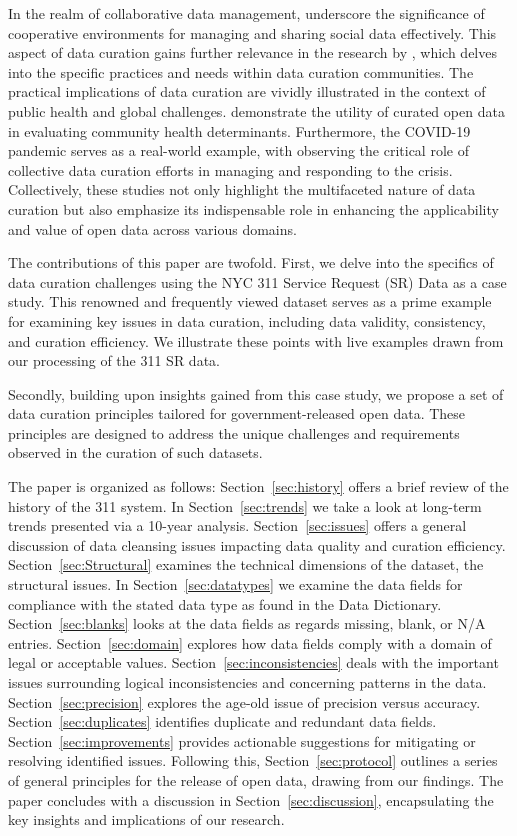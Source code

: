 \documentclass[12pt, titlepage]{article}
\begin{document}
In the realm of collaborative data management,
\citet{beheshti2019datasynapse} underscore the significance of
cooperative environments for managing and sharing social data
effectively. This aspect of data curation gains further relevance in
the research by \citet{mclure2014data}, which delves into the specific
practices and needs within data curation communities. The practical
implications of data curation are vividly illustrated in the context
of public health and global challenges. \citet{cantor2018facets}
demonstrate the utility of curated open data in evaluating community
health determinants. Furthermore, the COVID-19 pandemic serves as a
real-world example, with \citet{shankar2021data} observing the
critical role of collective data curation efforts in managing and
responding to the crisis. Collectively, these studies not only highlight the 
multifaceted nature of data curation but also emphasize
its indispensable role in enhancing the applicability and value of
open data across various domains.

The contributions of this paper are twofold. First, we delve into
the specifics of data curation challenges using the NYC 311 Service
Request (SR) Data as a case study. This renowned and frequently viewed 
dataset serves as a prime example for examining key issues in data curation, 
including data validity, consistency, and curation efficiency. 
We illustrate these points with live examples drawn from our processing of the 311 SR data. 

Secondly, building upon insights gained from this case study, we 
propose a set of data curation principles tailored for government-released open data. 
These principles are designed to address the unique challenges 
and requirements observed in the curation of such datasets.

The paper is organized as follows:
Section~\ref{sec:history} offers a brief review of the history of the 311 system. In 
Section~\ref{sec:trends} we take a look at long-term trends presented via a 10-year analysis.
Section~\ref{sec:issues} offers a general discussion of data cleansing issues
impacting data quality and curation efficiency. Section~\ref{sec:Structural} examines
the technical dimensions of the dataset, the structural issues. In Section~\ref{sec:datatypes} we examine the data fields
for compliance with the stated data type as found in the Data Dictionary. Section~\ref{sec:blanks} looks
at the data fields as regards missing, blank, or N/A entries. Section~\ref{sec:domain} explores
how data fields comply with a domain of legal or acceptable values. Section~\ref{sec:inconsistencies}
deals with the important issues surrounding logical inconsistencies and concerning patterns in the data. Section~\ref{sec:precision} 
explores the age-old issue of precision versus accuracy. Section~\ref{sec:duplicates}
identifies duplicate and redundant data fields. Section~\ref{sec:improvements} provides 
actionable suggestions for mitigating or resolving identified issues. Following this, Section~\ref{sec:protocol} outlines a series of general 
principles for the release of open data, drawing from our findings. The paper concludes with a discussion 
in Section~\ref{sec:discussion}, encapsulating the key insights and implications of our research.
\end{document}

